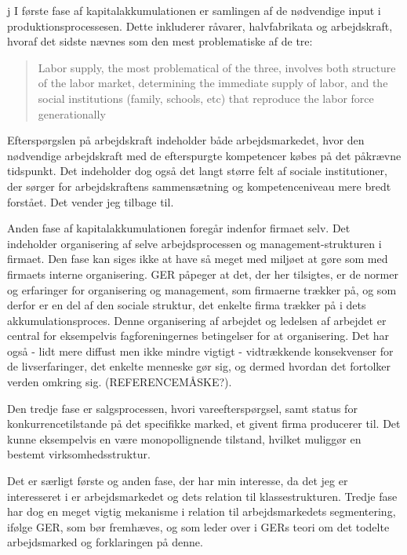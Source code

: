 j I første fase af kapitalakkumulationen er samlingen af de nødvendige input i produktionsprocessesen. Dette inkluderer råvarer, halvfabrikata og arbejdskraft, hvoraf det sidste nævnes som den mest problematiske af de tre:  
%
\begin{quote} \small %
Labor supply, the most problematical of the three, involves both structure of the labor market, determining the immediate supply of labor, and the social institutions (family, schools, etc) that reproduce the labor force generationally \label{aksocstruk}
\end{quote}
%
Efterspørgslen på arbejdskraft indeholder både arbejdsmarkedet, hvor den nødvendige arbejdskraft med de efterspurgte kompetencer købes på det påkrævne tidspunkt. Det indeholder dog også det langt større felt af sociale institutioner, der sørger for arbejdskraftens sammensætning og kompetenceniveau mere bredt forstået. Det vender jeg tilbage til.


Anden fase af kapitalakkumulationen foregår indenfor firmaet selv. Det indeholder organisering af selve arbejdsprocessen og management-strukturen i firmaet. Den fase kan siges ikke at have så meget med miljøet at gøre som med firmaets interne organisering. GER påpeger at det, der her tilsigtes, er de normer og erfaringer for organisering og management, som firmaerne trækker på, og som derfor er en del af den sociale struktur, det enkelte firma trækker på i dets akkumulationsproces. Denne organisering af arbejdet og ledelsen af arbejdet er central for eksempelvis fagforeningernes betingelser for at organisering. Det har også - lidt mere diffust men ikke mindre vigtigt - vidtrækkende konsekvenser for de livserfaringer, det enkelte menneske gør sig, og dermed hvordan det fortolker verden omkring sig. (REFERENCEMÅSKE?). 

Den tredje fase er salgsprocessen, hvori vareefterspørgsel,  samt status for konkurrencetilstande på det specifikke marked, et givent firma producerer til. Det kunne eksempelvis en være monopollignende tilstand, hvilket muliggør en bestemt virksomhedsstruktur. 

Det er særligt første og anden fase, der har min interesse, da det jeg er interesseret i er arbejdsmarkedet og dets relation til klassestrukturen. Tredje fase har dog en meget vigtig mekanisme i relation til arbejdsmarkedets segmentering, ifølge GER, som bør fremhæves, og som leder over i GERs teori om det todelte arbejdsmarked og forklaringen på denne.

